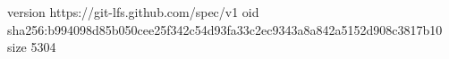 version https://git-lfs.github.com/spec/v1
oid sha256:b994098d85b050cee25f342c54d93fa33c2ec9343a8a842a5152d908c3817b10
size 5304
